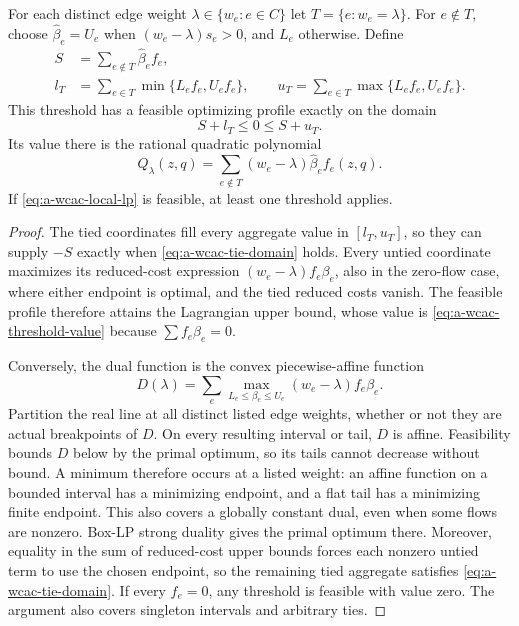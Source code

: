 \begin{lemma}
\label{lem:a-wcac-threshold}
For each distinct edge weight $\lambda\in\{w_e:e\in C\}$ let
$T=\{e:w_e=\lambda\}$. For $e\notin T$, choose $\widehat\beta_e=U_e$
when $(w_e-\lambda)s_e>0$, and $L_e$ otherwise. Define
\begin{align*}
 S&=\sum_{e\notin T}\widehat\beta_ef_e,\\
 l_T&=\sum_{e\in T}\min\{L_ef_e,U_ef_e\},\qquad
 u_T=\sum_{e\in T}\max\{L_ef_e,U_ef_e\}.
\end{align*}
This threshold has a feasible optimizing profile exactly on the domain
\begin{equation}
 S+l_T\le0\le S+u_T.
 \label{eq:a-wcac-tie-domain}
\end{equation}
Its value there is the rational quadratic polynomial
\begin{equation}
 Q_\lambda(z,q)=\sum_{e\notin T}(w_e-\lambda)\widehat\beta_ef_e(z,q).
 \label{eq:a-wcac-threshold-value}
\end{equation}
If \eqref{eq:a-wcac-local-lp} is feasible, at least one threshold applies.
\end{lemma}
\begin{proof}
The tied coordinates fill every aggregate value in $[l_T,u_T]$, so they
can supply $-S$ exactly when \eqref{eq:a-wcac-tie-domain} holds. Every
untied coordinate maximizes its reduced-cost expression
$(w_e-\lambda)f_e\beta_e$, also in the zero-flow case, where either
endpoint is optimal, and the tied reduced costs vanish. The feasible
profile therefore attains the Lagrangian upper bound, whose value is
\eqref{eq:a-wcac-threshold-value} because $\sum f_e\beta_e=0$.

Conversely, the dual function is the convex piecewise-affine function
\[
 D(\lambda)=\sum_e\max_{L_e\le\beta_e\le U_e}
                     (w_e-\lambda)f_e\beta_e.
\]
Partition the real line at all distinct listed edge weights, whether or
not they are actual breakpoints of $D$. On every resulting interval or
tail, $D$ is affine. Feasibility bounds $D$ below by the primal optimum,
so its tails cannot decrease without bound. A minimum therefore occurs
at a listed weight: an affine function on a bounded interval has a
minimizing endpoint, and a flat tail has a minimizing finite endpoint.
This also covers a globally constant dual, even when some flows are
nonzero. Box-LP strong duality gives the primal optimum there. Moreover,
equality in the sum of reduced-cost upper bounds forces each nonzero
untied term to use the chosen endpoint, so the remaining tied aggregate
satisfies \eqref{eq:a-wcac-tie-domain}. If every $f_e=0$, any threshold
is feasible with value zero. The argument also covers singleton intervals
and arbitrary ties.
\end{proof}

